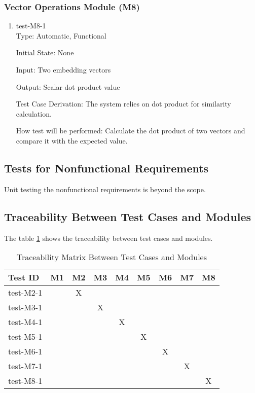 \documentclass[12pt, titlepage]{article}
\begin{document}
\subsubsection{Vector Operations Module (M8)}

\begin{enumerate}

\item{test-M8-1\\}
Type: Automatic, Functional
					
Initial State: None
					
Input: Two embedding vectors
					
Output: Scalar dot product value

Test Case Derivation: The system relies on dot product for similarity calculation.

How test will be performed: Calculate the dot product of two vectors and compare it with the expected value.

\end{enumerate}


\subsection{Tests for Nonfunctional Requirements}

Unit testing the nonfunctional requirements is beyond the scope. 

\subsection{Traceability Between Test Cases and Modules}
The table \ref{Table:Unit} shows the traceability between test cases and modules.


\begin{table}[h!]\label{Table:Unit}
  \centering
  \begin{tabular}{|l|c|c|c|c|c|c|c|c|}
  \hline
  \textbf{Test ID} & \textbf{M1} & \textbf{M2} & \textbf{M3} & \textbf{M4} & \textbf{M5} & \textbf{M6} & \textbf{M7} & \textbf{M8} \\
  \hline
  test-M2-1 &   & X &   &   &   &   &   &   \\
  test-M3-1 &   &   & X &   &   &   &   &   \\
  test-M4-1 &   &   &   & X &   &   &   &   \\
  test-M5-1 &   &   &   &   & X &   &   &   \\
  test-M6-1 &   &   &   &   &   & X &   &   \\
  test-M7-1 &   &   &   &   &   &  &  X &   \\
  test-M8-1 &   &   &   &   &   &   &   & X \\
  \hline
  \end{tabular}
  \caption{Traceability Matrix Between Test Cases and Modules}
  \end{table}
\end{document}
